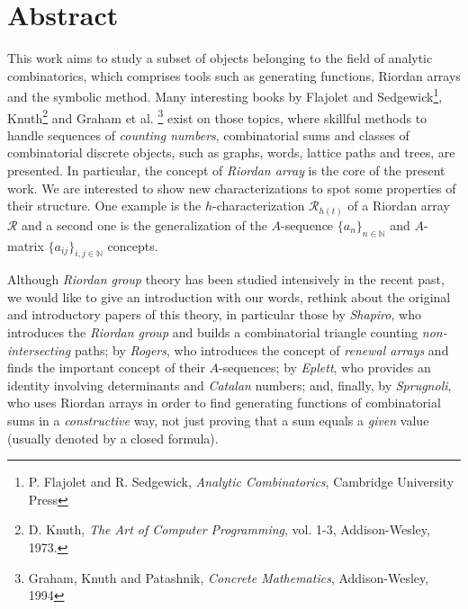 \begingroup
\let\clearpage\relax
\let\cleardoublepage\relax
\let\cleardoublepage\relax

\vskip-2cm
\chapter*{Abstract}
\iftrue
This work aims to study
a subset of objects belonging to the field of analytic combinatorics, which
comprises tools such as generating functions, Riordan arrays and the symbolic
method. Many interesting books by Flajolet and Sedgewick\footnote{P. Flajolet
and R.  Sedgewick, \emph{Analytic Combinatorics}, Cambridge University Press},
Knuth\footnote{D. Knuth, \emph{The Art of Computer Programming}, vol.  1-3,
Addison-Wesley, 1973.} and Graham et al. \footnote{Graham, Knuth and Patashnik,
\emph{Concrete Mathematics}, Addison-Wesley, 1994} exist on those topics, where
skillful methods to handle sequences of \emph{counting numbers}, combinatorial
sums and classes of combinatorial discrete objects, such as graphs, words,
lattice paths and trees, are presented. In particular, the concept of
\emph{Riordan array} is the core of the present work.  We are interested to
show new characterizations to spot some properties of their structure. One
example is the $h$-characterization $\mathcal{R}_{h(t)}$ of a Riordan array
$\mathcal{R}$ and a second one is the generalization of the $A$-sequence
$\lbrace a_{n}\rbrace_{n\in\mathbb{N}}$ and $A$-matrix $\lbrace
a_{ij}\rbrace_{i,j\in\mathbb{N}}$ concepts.

Although \emph{Riordan group} theory has been studied intensively in the recent past, we would
like to give an introduction with our words, rethink about the original and
introductory papers of this theory, in particular those by \emph{Shapiro}, who
introduces the \emph{Riordan group} and builds a combinatorial triangle
counting \emph{non-intersecting} paths; by \emph{Rogers}, who introduces the
concept of \emph{renewal arrays} and finds the important concept of their
$A$-sequences; by \emph{Eplett}, who provides an identity involving
determinants and \emph{Catalan} numbers; and, finally, by \emph{Sprugnoli}, who
uses Riordan arrays in order to find generating functions of combinatorial sums
in a \emph{constructive} way, not just proving that a sum equals a \emph{given}
value (usually denoted by a closed formula). 

